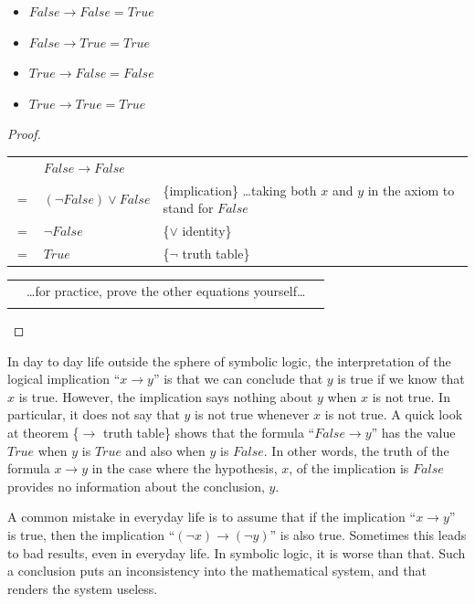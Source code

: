 \label{implication-truth-table}
\begin{theorem}
\mbox{}
\begin{itemize}
\item $False \rightarrow False = True$
\item $False \rightarrow True  = True$
\item $True  \rightarrow False = False$
\item $True  \rightarrow True  = True$
\end{itemize}
\end{theorem}

\begin{proof}
\mbox{} \\
\begin{tabular}{llp{3.15in}}
    & $False \rightarrow False$        & \\
$=$ & $(\neg False) \vee False$        & \{implication\} \dots taking both $x$ and $y$ in the axiom to stand for $False$ \\
$=$ & $\neg False$                     & \{$\vee$ identity\}\\
$=$ & $True$                           & \{$\neg$ truth table\}\\
\end{tabular}

\begin{tabular}{lll}
& \dots for practice, prove the other equations yourself\dots & \\         & \\
\end{tabular}

\end{proof}

In day to day life outside the sphere of symbolic logic,
the interpretation of the logical implication ``$x \rightarrow y$''
is that we can conclude that $y$ is true if we know that
$x$ is true. However, the implication says nothing
about $y$ when $x$ is not true. In particular, it
does not say that $y$ is not true whenever $x$ is not true.
A quick look at theorem \{$\rightarrow$ truth table\} shows that the
formula ``$False \rightarrow y$'' has the value $True$ when $y$ is $True$
and also when $y$ is $False$.
In other words, the truth of the formula $x \rightarrow y$ in the case
where the hypothesis, $x$, of the implication is $False$ provides
no information about the conclusion, $y$.

A common mistake in everyday life is to assume that if the
implication ``$x \rightarrow y$'' is true, then the implication
``$(\neg x) \rightarrow (\neg y)$''
is also true. Sometimes this leads to bad
results, even in everyday life. In symbolic logic,
it is worse than that. Such a conclusion puts an
inconsistency into the mathematical system, and that renders the system useless.

